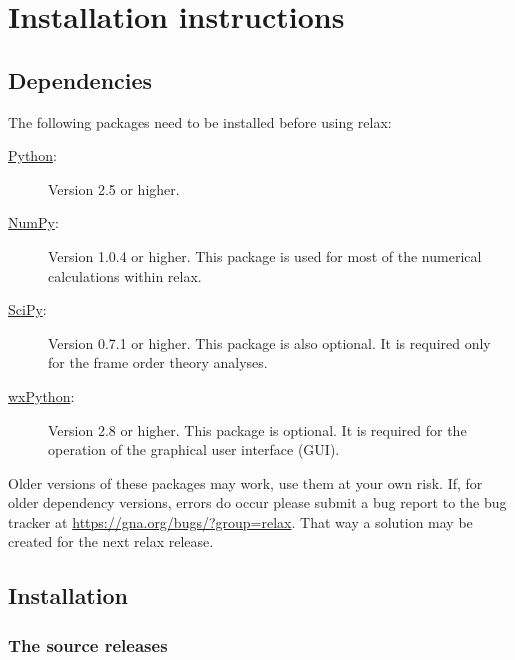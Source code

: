 
\chapter{Installation instructions}



\section{Dependencies}

The following packages need to be installed before using relax:

\begin{description}
\item[\href{http://python.org/}{Python}:]  Version 2.5 or higher.
\item[\href{http://numpy.scipy.org/}{NumPy}:]  Version 1.0.4 or higher.  This package is used for most of the numerical calculations within relax.
\item[\href{http://www.scipy.org/}{SciPy}:]  Version 0.7.1 or higher.  This package is also optional.  It is required only for the frame order theory analyses.
\item[\href{http://www.scipy.org/}{wxPython}:]  Version 2.8 or higher.  This package is optional.  It is required for the operation of the graphical user interface (GUI).
\end{description}

Older versions of these packages may work, use them at your own risk.  If, for older dependency versions, errors do occur please submit a bug report to the bug tracker at \href{https://gna.org/bugs/?group=relax}{https://gna.org/bugs/?group=relax}.  That way a solution may be created for the next relax release.




\section{Installation}


\subsection{The source releases}
\label{sect: source releases}

